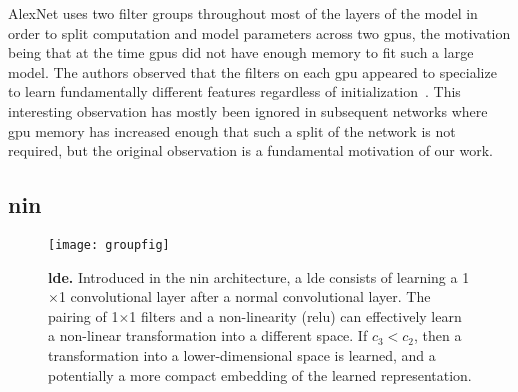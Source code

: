 \documentclass[thesis]{subfiles}
\begin{document}
AlexNet uses two filter groups throughout most of the layers of the model in order to split computation and model parameters across two \gls{gpu}s, the motivation being that at the time \gls{gpu}s did not have enough memory to fit such a large model. The authors observed that the filters on each \gls{gpu} appeared to specialize to learn fundamentally different features regardless of initialization~\citep{Krizhevsky2012}. This interesting observation has mostly been ignored in subsequent networks where \gls{gpu} memory has increased enough that such a split of the network is not required, but the original observation is a fundamental motivation of our work.

\subsection{\gls{nin}}
\begin{figure}[tbp]
    \centering
    \texttt{[image: groupfig]}
    \caption[Low-dimensional embedding]{\textbf{\acrlong{lde}.} Introduced in the \gls{nin} architecture, a \gls{lde} consists of learning a 1$\times$1 convolutional layer after a normal convolutional layer. The pairing of 1$\times$1 filters and a non-linearity (\ie \gls{relu}) can effectively learn a non-linear transformation into a different space. If $c_3 < c_2$, then a transformation into a lower-dimensional space is learned, and a potentially a more compact embedding of the learned representation.}\label{fig:lowdimembedding}
\end{figure}
\end{document}
